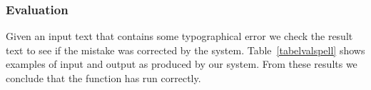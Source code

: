 \subsubsection*{Evaluation}
Given an input text that contains some typographical error  we check the result text to see if the mistake was corrected by the system. Table~\ref{tabelvalspell} shows examples of input and output as produced by our system. From these results we conclude that the function has run correctly.\\
\begin{table}[H]
    \caption {\label{tabelvalspell}Example result of evaluation}
\end{table}


